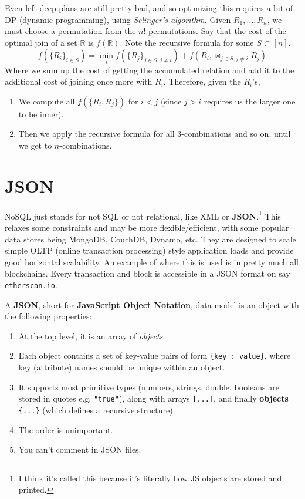 \documentclass{article}
\begin{document}
    Even left-deep plans are still pretty bad, and so optimizing this requires a bit of DP (dynamic programming), using \textit{Selinger's algorithm}. Given $R_1, \ldots, R_n$, we must choose a permutation from the $n!$ permutations. Say that the cost of the optimal join of a set $\mathbb{R}$ is $f(\mathbb{R})$. Note the recursive formula for some $S \subset [n]$. 
    \begin{equation}
      f(\{R_i\}_{i \in S}) = \min_i f(\{R_j\}_{j \in S, j \neq i}) + f(R_i, \bowtie_{j \in S, j \neq i} R_j) 
    \end{equation}
    Where we sum up the cost of getting the accumulated relation and add it to the additional cost of joining once more with $R_i$. Therefore, given the $R_i$'s, 
    \begin{enumerate}
      \item We compute all $f(\{R_i, R_j\})$ for $i < j$ (since $j > i$ requires us the larger one to be inner). 
      \item Then we apply the recursive formula for all 3-combinations and so on, until we get to $n$-combinations. 
    \end{enumerate}

\section{JSON}

  NoSQL just stands for not SQL or not relational, like XML or \textbf{JSON}.\footnote{I think it's called this because it's literally how JS objects are stored and printed.} This relaxes some constraints and may be more flexible/efficient, with some popular data stores being MongoDB, CouchDB, Dynamo, etc. They are designed to scale simple OLTP (online transaction processing) style application loads and provide good horizontal scalability. An example of where this is used is in pretty much all blockchains. Every transaction and block is accessible in a JSON format on say \texttt{etherscan.io}. 

  \begin{definition}[JSON]
    A \textbf{JSON}, short for \textbf{JavaScript Object Notation}, data model is an object with the following properties: 
    \begin{enumerate} 
      \item At the top level, it is an array of \textit{objects}. 
      \item Each object contains a set of key-value pairs of form \texttt{\{key : value\}}, where key (attribute) names should be unique within an object. 
      \item It supports most primitive types (numbers, strings, double, booleans are stored in quotes e.g. \texttt{"true"}), along with arrays \texttt{[...]}, and finally \textbf{objects} \texttt{\{...\}} (which defines a recursive structure). 
      \item The order is unimportant. 
      \item You can't comment in JSON files. 
    \end{enumerate}
  \end{definition}
\end{document}
